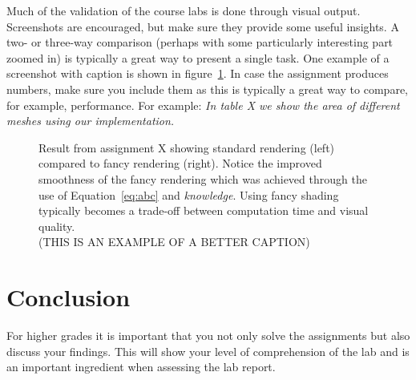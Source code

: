\documentclass[onecolumn]{article}
\begin{document}
Much of the validation of the course labs is done through visual output. Screenshots are encouraged, but make sure they provide some useful insights. A two- or three-way comparison (perhaps with some particularly interesting part zoomed in) is typically a great way to present a single task. One example of a screenshot with caption is shown in figure~\ref{fig:demo}. In case the assignment produces numbers, make sure you include them as this is typically a great way to compare, for example, performance. For example: \emph{In table X we show the area of different meshes using our implementation.}

\begin{figure}[t]
\centering
{}
\caption{\label{fig:demo}
Result from assignment X showing standard rendering (left) compared to fancy rendering (right). Notice the improved smoothness of the fancy rendering which was achieved through the use of Equation~\ref{eq:abc} and \emph{knowledge}. Using fancy shading typically becomes a trade-off between computation time and visual quality.\\(THIS IS AN EXAMPLE OF A BETTER CAPTION)}
\end{figure}


\section{Conclusion}
For higher grades it is important that you not only solve the assignments but also discuss your findings. This will show your level of comprehension of the lab and is an important ingredient when assessing  the lab report.
\end{document}
